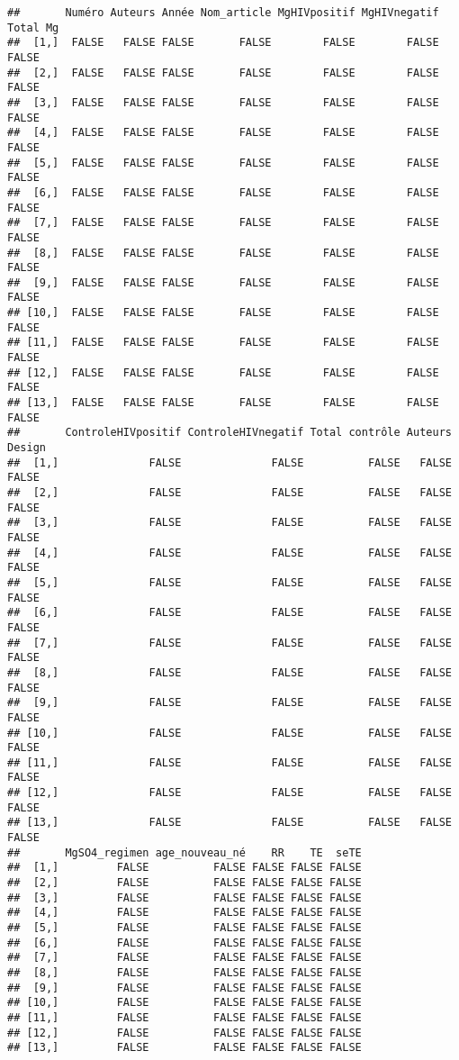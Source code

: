 \documentclass[
]{article}
\begin{document}
\begin{verbatim}
##       Numéro Auteurs Année Nom_article MgHIVpositif MgHIVnegatif Total Mg
##  [1,]  FALSE   FALSE FALSE       FALSE        FALSE        FALSE    FALSE
##  [2,]  FALSE   FALSE FALSE       FALSE        FALSE        FALSE    FALSE
##  [3,]  FALSE   FALSE FALSE       FALSE        FALSE        FALSE    FALSE
##  [4,]  FALSE   FALSE FALSE       FALSE        FALSE        FALSE    FALSE
##  [5,]  FALSE   FALSE FALSE       FALSE        FALSE        FALSE    FALSE
##  [6,]  FALSE   FALSE FALSE       FALSE        FALSE        FALSE    FALSE
##  [7,]  FALSE   FALSE FALSE       FALSE        FALSE        FALSE    FALSE
##  [8,]  FALSE   FALSE FALSE       FALSE        FALSE        FALSE    FALSE
##  [9,]  FALSE   FALSE FALSE       FALSE        FALSE        FALSE    FALSE
## [10,]  FALSE   FALSE FALSE       FALSE        FALSE        FALSE    FALSE
## [11,]  FALSE   FALSE FALSE       FALSE        FALSE        FALSE    FALSE
## [12,]  FALSE   FALSE FALSE       FALSE        FALSE        FALSE    FALSE
## [13,]  FALSE   FALSE FALSE       FALSE        FALSE        FALSE    FALSE
##       ControleHIVpositif ControleHIVnegatif Total contrôle Auteurs Design
##  [1,]              FALSE              FALSE          FALSE   FALSE  FALSE
##  [2,]              FALSE              FALSE          FALSE   FALSE  FALSE
##  [3,]              FALSE              FALSE          FALSE   FALSE  FALSE
##  [4,]              FALSE              FALSE          FALSE   FALSE  FALSE
##  [5,]              FALSE              FALSE          FALSE   FALSE  FALSE
##  [6,]              FALSE              FALSE          FALSE   FALSE  FALSE
##  [7,]              FALSE              FALSE          FALSE   FALSE  FALSE
##  [8,]              FALSE              FALSE          FALSE   FALSE  FALSE
##  [9,]              FALSE              FALSE          FALSE   FALSE  FALSE
## [10,]              FALSE              FALSE          FALSE   FALSE  FALSE
## [11,]              FALSE              FALSE          FALSE   FALSE  FALSE
## [12,]              FALSE              FALSE          FALSE   FALSE  FALSE
## [13,]              FALSE              FALSE          FALSE   FALSE  FALSE
##       MgSO4_regimen age_nouveau_né    RR    TE  seTE
##  [1,]         FALSE          FALSE FALSE FALSE FALSE
##  [2,]         FALSE          FALSE FALSE FALSE FALSE
##  [3,]         FALSE          FALSE FALSE FALSE FALSE
##  [4,]         FALSE          FALSE FALSE FALSE FALSE
##  [5,]         FALSE          FALSE FALSE FALSE FALSE
##  [6,]         FALSE          FALSE FALSE FALSE FALSE
##  [7,]         FALSE          FALSE FALSE FALSE FALSE
##  [8,]         FALSE          FALSE FALSE FALSE FALSE
##  [9,]         FALSE          FALSE FALSE FALSE FALSE
## [10,]         FALSE          FALSE FALSE FALSE FALSE
## [11,]         FALSE          FALSE FALSE FALSE FALSE
## [12,]         FALSE          FALSE FALSE FALSE FALSE
## [13,]         FALSE          FALSE FALSE FALSE FALSE
\end{verbatim}
\end{document}
